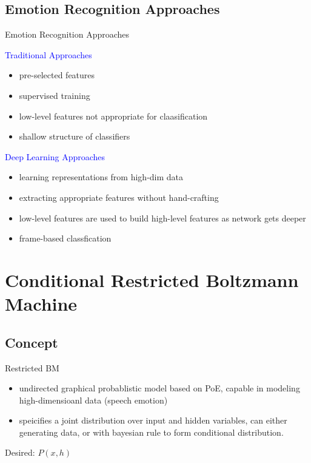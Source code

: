 \subsection{Emotion Recognition Approaches}

\begin{frame}[t]{Emotion Recognition Approaches}
	\begin{minipage}[t]{0.48\linewidth}
	  \textcolor{blue}{\Large Traditional Approaches}
	  \begin{itemize}
	   \item pre-selected features
	   \item supervised training
	   \item low-level features not appropriate for claasification
	   \item shallow structure of classifiers
	  \end{itemize}
	\end{minipage}\hfill
	\begin{minipage}[t]{0.48\linewidth}
	\textcolor{blue}{\Large Deep Learning Approaches}
	  \begin{itemize}
	   \item learning representations from high-dim data
	   \item extracting appropriate features without hand-crafting
	   \item low-level features are used to build high-level features as network gets deeper
	   \item frame-based classfication
	  \end{itemize}

	\end{minipage}

\end{frame}


\section{Conditional Restricted Boltzmann Machine}
	\subsection{Concept}
	\begin{frame}[t]{Restricted BM}
	\begin{minipage}[t]{\linewidth}
	 \begin{itemize}
	  \item undirected graphical probablistic model based on PoE, capable in modeling high-dimensioanl data (speech emotion)
	  \item speicifies a joint distribution over input and hidden variables, can either generating data, or with bayesian
rule to form conditional distribution. 
	 \end{itemize}
	\end{minipage}\hfill
	\vspace{5mm}
	\begin{minipage}[t]{0.48\linewidth}
	 Desired:
	 $P(x,h)$
	\end{minipage}

	
	\end{frame}


